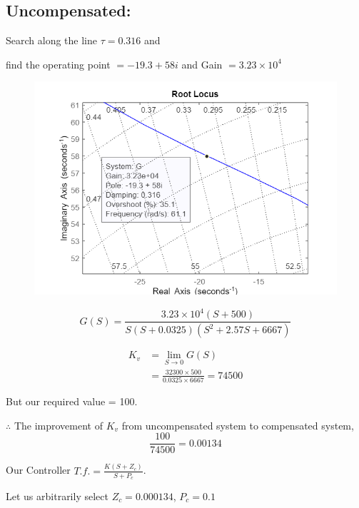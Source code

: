 \documentclass[12pt]{article}
\begin{document}
\noindent
\subsection*{Uncompensated:}
Search along the line \(\tau = 0.316\) and \par find the operating point \(= -19.3 + 58i\) and Gain \( = 3.23 \times 10^4\) \par

\begin{figure}[H]
  \centering
  \includegraphics[width=0.8\linewidth]{images/plot5.png}
  \label{fig:plot_5}
\end{figure}

\begin{equation}
  G(S) = \frac{3.23 \times 10^4 (S+500)}{S(S+0.0325)(S^2 + 2.57S + 6667)}
\end{equation}

\begin{equation}
  \begin{aligned}
    K_v &= \lim_{S \rightarrow 0} G(S)\\
    &= \frac{32300 \times 500}{0.0325 \times 6667} = 74500
  \end{aligned}
\end{equation}

But our required value = 100. \par

\(\therefore\) The improvement of \(K_v\) from uncompensated system to compensated system,
\begin{equation}
  \frac{100}{74500} = 0.00134
\end{equation}

Our Controller \(T.f. = \frac{K(S + Z_c)}{S + P_c}\). \par

Let us arbitrarily select \(Z_c = 0.000134\), \(P_c = 0.1\) \par
\end{document}
